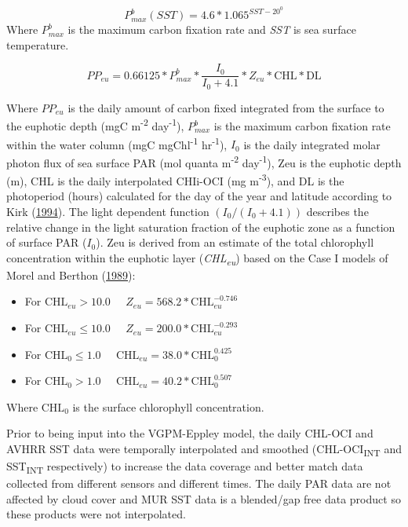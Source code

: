 \documentclass[
]{book}
\providecommand{\tightlist}{%
  \setlength{\itemsep}{0pt}\setlength{\parskip}{0pt}}
\begin{document}
\begin{equation}
P_{max}^{b}(SST) = 4.6 * 1.065^{SST-20^{0}} 
\label{eq:two} 
\end{equation}
Where \(P_{max}^{b}\) is the maximum carbon fixation rate and \emph{SST} is sea surface temperature.

\begin{equation}
PP_{eu} = 0.66125 * P_{max}^{b} * \frac{I_{0}}{I_{0}+4.1} * Z_{eu} * \textrm{CHL} * \text{DL}
\label{eq:three} 
\end{equation}

Where \(PP_{eu}\) is the daily amount of carbon fixed integrated from the surface to the euphotic depth (mgC m\textsuperscript{-2} day\textsuperscript{-1}), \(P_{max}^{b}\) is the maximum carbon fixation rate within the water column (mgC mgChl\textsuperscript{-1} hr\textsuperscript{-1}), \(I_{0}\) is the daily integrated molar photon flux of sea surface PAR (mol quanta m\textsuperscript{-2} day\textsuperscript{-1}), Zeu is the euphotic depth (m), CHL is the daily interpolated CHIi-OCI (mg m\textsuperscript{-3}), and DL is the photoperiod (hours) calculated for the day of the year and latitude according to Kirk (\protect\hyperlink{ref-SOE6}{1994}). The light dependent function \((I_{0}/(I_{0}+4.1))\) describes the relative change in the light saturation fraction of the euphotic zone as a function of surface PAR (\(I_0\)). Zeu is derived from an estimate of the total chlorophyll concentration within the euphotic layer (\emph{CHL\textsubscript{eu}}) based on the Case I models of Morel and Berthon (\protect\hyperlink{ref-SOE8}{1989}):

\begin{itemize}
\tightlist
\item
  For \(\textrm{CHL}_{eu} > 10.0\;\;\;\;\;Z_{eu} = 568.2 * \textrm{CHL}_{eu}^{-0.746}\)
\item
  For \(\textrm{CHL}_{eu} \leq 10.0\;\;\;\;\;Z_{eu} = 200.0 * \textrm{CHL}_{eu}^{-0.293}\)
\item
  For \(\textrm{CHL}_{0} \leq 1.0\;\;\;\;\;\textrm{CHL}_{eu} = 38.0 * \textrm{CHL}_{0}^{0.425}\)
\item
  For \(\textrm{CHL}_{0} > 1.0\;\;\;\;\;\textrm{CHL}_{eu} = 40.2 * \textrm{CHL}_{0}^{0.507}\)
\end{itemize}

Where \(\textrm{CHL}_0\) is the surface chlorophyll concentration.

Prior to being input into the VGPM-Eppley model, the daily CHL-OCI and AVHRR SST data were temporally interpolated and smoothed (CHL-OCI\textsubscript{INT} and SST\textsubscript{INT} respectively) to increase the data coverage and better match data collected from different sensors and different times. The daily PAR data are not affected by cloud cover and MUR SST data is a blended/gap free data product so these products were not interpolated.
\end{document}
